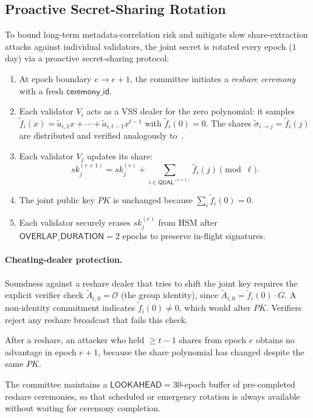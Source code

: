 \subsection{Proactive Secret-Sharing Rotation}
\label{sec:mint-rotation}

To bound long-term metadata-correlation risk and mitigate slow share-extraction attacks against individual validators, the joint secret is rotated every epoch ($1$ day) via a proactive secret-sharing protocol:

\begin{enumerate}[leftmargin=2em,itemsep=0.2em]
  \item At epoch boundary $e \to e + 1$, the committee initiates a \emph{reshare ceremony} with a fresh $\mathsf{ceremony\_id}$.
  \item Each validator $V_i$ acts as a VSS dealer for the zero polynomial: it samples $\tilde{f}_i(x) = \tilde{a}_{i,1} x + \cdots + \tilde{a}_{i,t-1} x^{t-1}$ with $\tilde{f}_i(0) = 0$. The shares $\tilde\sigma_{i \to j} = \tilde{f}_i(j)$ are distributed and verified analogously to~.
  \item Each validator $V_j$ updates its share:
    \[
      sk_j^{(e+1)} = sk_j^{(e)} + \sum_{i \in \mathsf{QUAL}^{(e+1)}} \tilde{f}_i(j) \pmod{\ell}.
    \]
  \item The joint public key $PK$ is unchanged because $\sum_i \tilde{f}_i(0) = 0$.
  \item Each validator securely erases $sk_j^{(e)}$ from HSM after $\mathsf{OVERLAP\_DURATION} = 2$ epochs to preserve in-flight signatures.
\end{enumerate}

\paragraph{Cheating-dealer protection.} Soundness against a reshare dealer that tries to shift the joint key requires the explicit verifier check $\tilde{A}_{i,0} = \mathcal{O}$ (the group identity), since $\tilde{A}_{i,0} = \tilde{f}_i(0) \cdot G$. A non-identity commitment indicates $\tilde{f}_i(0) \neq 0$, which would alter $PK$. Verifiers reject any reshare broadcast that fails this check.

After a reshare, an attacker who held $\geq t-1$ shares from epoch $e$ obtains no advantage in epoch $e+1$, because the share polynomial has changed despite the same $PK$.

The committee maintains a $\mathsf{LOOKAHEAD} = 30$-epoch buffer of pre-completed reshare ceremonies, so that scheduled or emergency rotation is always available without waiting for ceremony completion.

